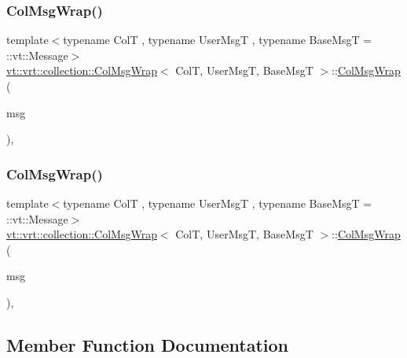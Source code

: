 \subsubsection{\texorpdfstring{Col\+Msg\+Wrap()}{ColMsgWrap()}\hspace{0.1cm}{\footnotesize\ttfamily [2/3]}}
{\footnotesize\ttfamily template$<$typename ColT , typename User\+MsgT , typename Base\+MsgT  = \+::vt\+::\+Message$>$ \\
\hyperlink{structvt_1_1vrt_1_1collection_1_1_col_msg_wrap}{vt\+::vrt\+::collection\+::\+Col\+Msg\+Wrap}$<$ ColT, User\+MsgT, Base\+MsgT $>$\+::\hyperlink{structvt_1_1vrt_1_1collection_1_1_col_msg_wrap}{Col\+Msg\+Wrap} (\begin{DoxyParamCaption}\item[{User\+MsgT \&\&}]{msg }\end{DoxyParamCaption})\hspace{0.3cm}{\ttfamily [inline]}, {\ttfamily [explicit]}}

\mbox{\label{structvt_1_1vrt_1_1collection_1_1_col_msg_wrap_ac19f3573a80a849d41fd5874fe94414a}} 
\subsubsection{\texorpdfstring{Col\+Msg\+Wrap()}{ColMsgWrap()}\hspace{0.1cm}{\footnotesize\ttfamily [3/3]}}
{\footnotesize\ttfamily template$<$typename ColT , typename User\+MsgT , typename Base\+MsgT  = \+::vt\+::\+Message$>$ \\
\hyperlink{structvt_1_1vrt_1_1collection_1_1_col_msg_wrap}{vt\+::vrt\+::collection\+::\+Col\+Msg\+Wrap}$<$ ColT, User\+MsgT, Base\+MsgT $>$\+::\hyperlink{structvt_1_1vrt_1_1collection_1_1_col_msg_wrap}{Col\+Msg\+Wrap} (\begin{DoxyParamCaption}\item[{User\+MsgT const \&}]{msg }\end{DoxyParamCaption})\hspace{0.3cm}{\ttfamily [inline]}, {\ttfamily [explicit]}}



\subsection{Member Function Documentation}
\mbox{\label{structvt_1_1vrt_1_1collection_1_1_col_msg_wrap_a69d30485a72651a7ede17f6bcdb13cd4}} 
